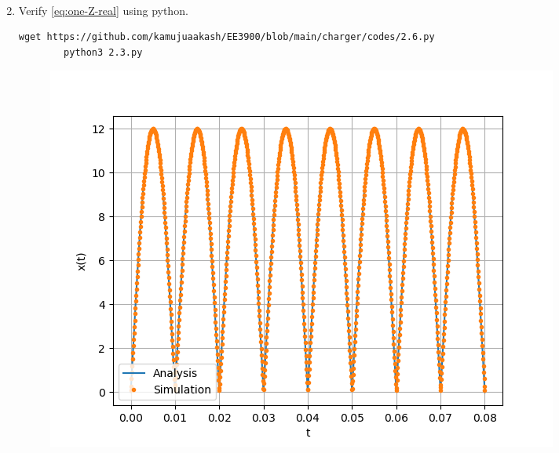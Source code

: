 \documentclass[journal,12pt,twocolumn]{IEEEtran}
\renewcommand\thesection{\arabic{section}}
\begin{document}
\begin{enumerate}[label=\thesection.\arabic*,ref=\thesection.\theenumi]
\begin{align}
    \end{align}
    \item Verify 
    \eqref{eq:one-Z-real}
    using python.\\
     \solution 
        \begin{lstlisting}
wget https://github.com/kamujuaakash/EE3900/blob/main/charger/codes/2.6.py
        python3 2.3.py
        \end{lstlisting}
          \begin{figure}[!ht]
			\centering
			\includegraphics[width=\columnwidth]{./figs/2.6.png}
			\caption{}
\end{figure}
    \end{enumerate}
\end{document}
